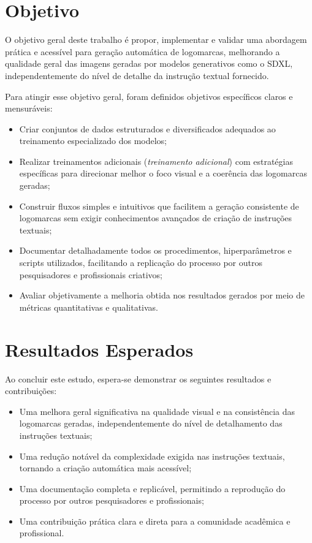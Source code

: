 \documentclass[12pt, %
openright, 
oneside, %
a4paper,    %
brazil]{facom-ufu-abntex2}
\begin{document}
\section{Objetivo}

O objetivo geral deste trabalho é propor, implementar e validar uma abordagem prática e acessível para geração automática de logomarcas, melhorando a qualidade geral das imagens geradas por modelos generativos como o SDXL, independentemente do nível de detalhe da instrução textual fornecido.

Para atingir esse objetivo geral, foram definidos objetivos específicos claros e mensuráveis:

\begin{itemize}
    \item Criar conjuntos de dados estruturados e diversificados adequados ao treinamento especializado dos modelos;
    \item Realizar treinamentos adicionais (\textit{treinamento adicional}) com estratégias específicas para direcionar melhor o foco visual e a coerência das logomarcas geradas;
    \item Construir fluxos simples e intuitivos que facilitem a geração consistente de logomarcas sem exigir conhecimentos avançados de criação de instruções textuais;
    \item Documentar detalhadamente todos os procedimentos, hiperparâmetros e scripts utilizados, facilitando a replicação do processo por outros pesquisadores e profissionais criativos;
    \item Avaliar objetivamente a melhoria obtida nos resultados gerados por meio de métricas quantitativas e qualitativas.
\end{itemize}

\section{Resultados Esperados}

Ao concluir este estudo, espera-se demonstrar os seguintes resultados e contribuições:

\begin{itemize}
    \item Uma melhora geral significativa na qualidade visual e na consistência das logomarcas geradas, independentemente do nível de detalhamento das instruções textuais;
    \item Uma redução notável da complexidade exigida nas instruções textuais, tornando a criação automática mais acessível;
    \item Uma documentação completa e replicável, permitindo a reprodução do processo por outros pesquisadores e profissionais;
    \item Uma contribuição prática clara e direta para a comunidade acadêmica e profissional.
\end{itemize}
\end{document}
